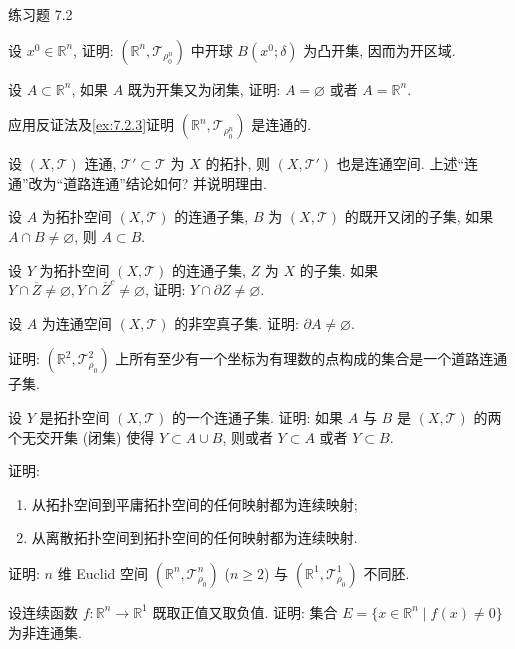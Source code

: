 \begin{exblock}{练习题 7.2}

  \item 设 $x^{0} \in \mathbb{R}^{n}$, 证明: $(\mathbb{R}^{n}, \mathcal{T}_{\rho_{0}^{n}})$ 中开球 $B(x^{0}; \delta)$ 为凸开集, 因而为开区域.

  \item 设 $A \subset \mathbb{R}^n$, 如果 $A$ 既为开集又为闭集, 证明: $A = \varnothing$ 或者 $A = \mathbb{R}^n$.

  \item 应用反证法及\cref{ex:7.2.3}证明 $(\mathbb{R}^{n}, \mathcal{T}_{\rho_{0}^{n}})$ 是连通的.

  \item 设 $(X, \mathcal{T})$ 连通, $\mathcal{T}' \subset \mathcal{T}$ 为 $X$ 的拓扑, 则 $(X, \mathcal{T}')$ 也是连通空间. 上述``连通''改为``道路连通''结论如何? 并说明理由.

  \item 设 $A$ 为拓扑空间 $(X, \mathcal{T})$ 的连通子集, $B$ 为 $(X, \mathcal{T})$ 的既开又闭的子集, 如果 $A \cap B \neq \varnothing$, 则 $A \subset B$.

  \item 设 $Y$ 为拓扑空间 $(X, \mathcal{T})$ 的连通子集, $Z$ 为 $X$ 的子集. 如果 $Y \cap \overline{Z} \neq \varnothing, Y \cap \overline{Z}^c \neq \varnothing$, 证明: $Y \cap \partial Z \neq \varnothing$.

  \item 设 $A$ 为连通空间 $(X, \mathcal{T})$ 的非空真子集. 证明: $\partial A \neq \varnothing$.

  \item 证明: $(\mathbb{R}^{2}, \mathcal{T}_{\rho_{0}}^{2})$ 上所有至少有一个坐标为有理数的点构成的集合是一个道路连通子集.

  \item 设 $Y$ 是拓扑空间 $(X, \mathcal{T})$ 的一个连通子集. 证明: 如果 $A$ 与 $B$ 是 $(X, \mathcal{T})$ 的两个无交开集 (闭集) 使得 $Y \subset A \cup B$, 则或者 $Y \subset A$ 或者 $Y \subset B$.

  \item 证明:
  \begin{enumerate}
    \item 从拓扑空间到平庸拓扑空间的任何映射都为连续映射;
    \item 从离散拓扑空间到拓扑空间的任何映射都为连续映射.
  \end{enumerate}

  \item 证明: $n$ 维 Euclid 空间 $(\mathbb{R}^{n}, \mathcal{T}_{\rho_{0}}^{n})$ ($n \geqslant 2$) 与 $(\mathbb{R}^{1}, \mathcal{T}_{\rho_{0}}^{1})$ 不同胚.

  \item 设连续函数 $f\colon \mathbb{R}^n \to \mathbb{R}^1$ 既取正值又取负值. 证明: 集合 $E = \{x \in \mathbb{R}^n \mid f(x) \neq 0\}$ 为非连通集.
\end{exblock}

